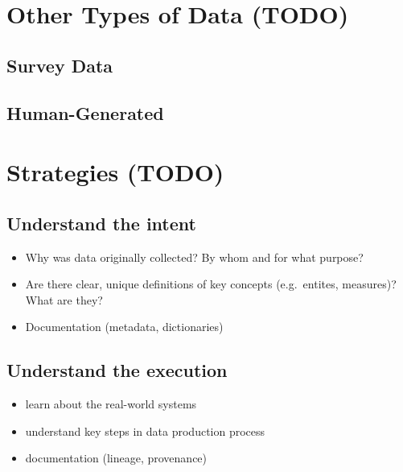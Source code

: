 \documentclass[
]{krantz}
\providecommand{\tightlist}{%
  \setlength{\itemsep}{0pt}\setlength{\parskip}{0pt}}
\begin{document}
\hypertarget{other-types-of-data-todo}{%
\section{Other Types of Data (TODO)}\label{other-types-of-data-todo}}

\hypertarget{survey-data}{%
\subsection{Survey Data}\label{survey-data}}

\hypertarget{human-generated}{%
\subsection{Human-Generated}\label{human-generated}}

\hypertarget{strategies-todo}{%
\section{Strategies (TODO)}\label{strategies-todo}}

\hypertarget{understand-the-intent}{%
\subsection{Understand the intent}\label{understand-the-intent}}

\begin{itemize}
\tightlist
\item
  Why was data originally collected? By whom and for what purpose?
\item
  Are there clear, unique definitions of key concepts (e.g.~entites, measures)? What are they?
\item
  Documentation (metadata, dictionaries)
\end{itemize}

\hypertarget{understand-the-execution}{%
\subsection{Understand the execution}\label{understand-the-execution}}

\begin{itemize}
\tightlist
\item
  learn about the real-world systems
\item
  understand key steps in data production process
\item
  documentation (lineage, provenance)
\end{itemize}
\end{document}

